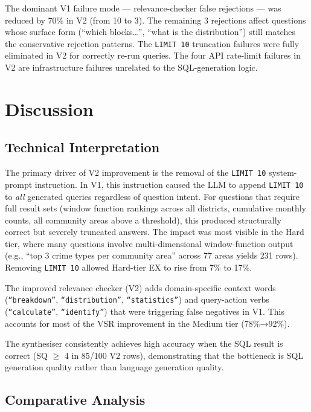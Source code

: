 The dominant V1 failure mode — relevance-checker false rejections — was reduced
by 70\% in V2 (from 10 to 3). The remaining 3 rejections affect questions whose
surface form (``which blocks\ldots'', ``what is the distribution'') still matches
the conservative rejection patterns. The \texttt{LIMIT 10} truncation failures
were fully eliminated in V2 for correctly re-run queries. The four API rate-limit
failures in V2 are infrastructure failures unrelated to the SQL-generation logic.

\section{Discussion}

\subsection{Technical Interpretation}

The primary driver of V2 improvement is the removal of the \texttt{LIMIT 10}
system-prompt instruction. In V1, this instruction caused the LLM to append
\texttt{LIMIT 10} to \emph{all} generated queries regardless of question intent.
For questions that require full result sets (window function rankings across all
districts, cumulative monthly counts, all community areas above a threshold), this
produced structurally correct but severely truncated answers. The impact was most
visible in the Hard tier, where many questions involve multi-dimensional
window-function output (e.g., ``top 3 crime types per community area'' across 77
areas yields 231 rows). Removing \texttt{LIMIT 10} allowed Hard-tier EX to rise
from 7\% to 17\%.

The improved relevance checker (V2) adds domain-specific context words
(\texttt{``breakdown''}, \texttt{``distribution''}, \texttt{``statistics''}) and
query-action verbs (\texttt{``calculate''}, \texttt{``identify''}) that were
triggering false negatives in V1. This accounts for most of the VSR improvement
in the Medium tier (78\%→92\%).

The synthesiser consistently achieves high accuracy when the SQL result is
correct (SQ $\geq$ 4 in 85/100 V2 rows), demonstrating that the bottleneck is
SQL generation quality rather than language generation quality.

\subsection{Comparative Analysis}

